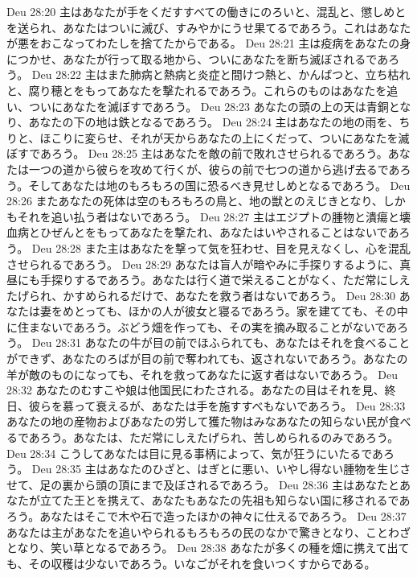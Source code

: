 Deu 28:20  主はあなたが手をくだすすべての働きにのろいと、混乱と、懲しめとを送られ、あなたはついに滅び、すみやかにうせ果てるであろう。これはあなたが悪をおこなってわたしを捨てたからである。
Deu 28:21  主は疫病をあなたの身につかせ、あなたが行って取る地から、ついにあなたを断ち滅ぼされるであろう。
Deu 28:22  主はまた肺病と熱病と炎症と間けつ熱と、かんばつと、立ち枯れと、腐り穂とをもってあなたを撃たれるであろう。これらのものはあなたを追い、ついにあなたを滅ぼすであろう。
Deu 28:23  あなたの頭の上の天は青銅となり、あなたの下の地は鉄となるであろう。
Deu 28:24  主はあなたの地の雨を、ちりと、ほこりに変らせ、それが天からあなたの上にくだって、ついにあなたを滅ぼすであろう。
Deu 28:25  主はあなたを敵の前で敗れさせられるであろう。あなたは一つの道から彼らを攻めて行くが、彼らの前で七つの道から逃げ去るであろう。そしてあなたは地のもろもろの国に恐るべき見せしめとなるであろう。
Deu 28:26  またあなたの死体は空のもろもろの鳥と、地の獣とのえじきとなり、しかもそれを追い払う者はないであろう。
Deu 28:27  主はエジプトの腫物と潰瘍と壊血病とひぜんとをもってあなたを撃たれ、あなたはいやされることはないであろう。
Deu 28:28  また主はあなたを撃って気を狂わせ、目を見えなくし、心を混乱させられるであろう。
Deu 28:29  あなたは盲人が暗やみに手探りするように、真昼にも手探りするであろう。あなたは行く道で栄えることがなく、ただ常にしえたげられ、かすめられるだけで、あなたを救う者はないであろう。
Deu 28:30  あなたは妻をめとっても、ほかの人が彼女と寝るであろう。家を建てても、その中に住まないであろう。ぶどう畑を作っても、その実を摘み取ることがないであろう。
Deu 28:31  あなたの牛が目の前でほふられても、あなたはそれを食べることができず、あなたのろばが目の前で奪われても、返されないであろう。あなたの羊が敵のものになっても、それを救ってあなたに返す者はないであろう。
Deu 28:32  あなたのむすこや娘は他国民にわたされる。あなたの目はそれを見、終日、彼らを慕って衰えるが、あなたは手を施すすべもないであろう。
Deu 28:33  あなたの地の産物およびあなたの労して獲た物はみなあなたの知らない民が食べるであろう。あなたは、ただ常にしえたげられ、苦しめられるのみであろう。
Deu 28:34  こうしてあなたは目に見る事柄によって、気が狂うにいたるであろう。
Deu 28:35  主はあなたのひざと、はぎとに悪い、いやし得ない腫物を生じさせて、足の裏から頭の頂にまで及ぼされるであろう。
Deu 28:36  主はあなたとあなたが立てた王とを携えて、あなたもあなたの先祖も知らない国に移されるであろう。あなたはそこで木や石で造ったほかの神々に仕えるであろう。
Deu 28:37  あなたは主があなたを追いやられるもろもろの民のなかで驚きとなり、ことわざとなり、笑い草となるであろう。
Deu 28:38  あなたが多くの種を畑に携えて出ても、その収穫は少ないであろう。いなごがそれを食いつくすからである。
